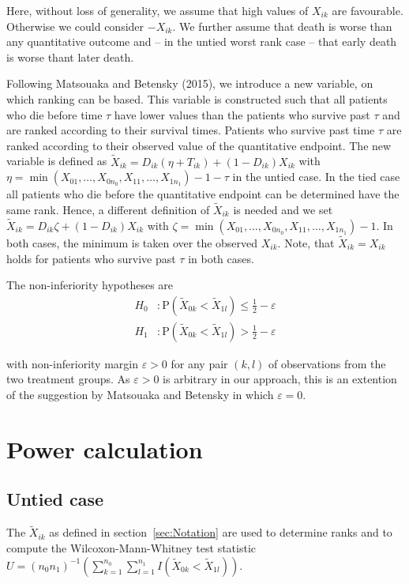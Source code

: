 \documentclass[bimj,fleqn]{w-art}
\theoremstyle{plain}
\theoremstyle{definition}
\begin{document}
Here, without loss of generality, we assume that high values of $X_{ik}$ are
favourable. Otherwise we could consider $-X_{ik}$. We further assume that
death is worse than any quantitative outcome and -- in the untied worst rank
case -- that early death is worse thant later death.

Following Matsouaka and Betensky (2015), we introduce a new variable, on which
ranking can be based. This variable is constructed such that all patients who
die before time $\tau$ have lower values than the patients who survive past
$\tau$ and are ranked according to their survival times. Patients who survive
past time $\tau$ are ranked according to their observed value of the quantitative
endpoint. The new variable is defined as
$\widetilde{X}_{ik} = D_{ik}(\eta  + T_{ik}) + (1 - D_{ik})X_{ik}$ with
$\eta = \min(X_{01}, \ldots, X_{0n_0}, X_{11}, \ldots, X_{1n_1}) - 1 - \tau$
in the untied case. In the tied case all patients who die before the quantitative endpoint
can be determined have the same rank. Hence, a different definition of $\widetilde{X}_{ik}$
is needed and we set  $\widetilde{X}_{ik} = D_{ik}\zeta   + (1 - D_{ik})X_{ik}$
with $\zeta = \min(X_{01}, \ldots, X_{0n_0}, X_{11}, \ldots, X_{1n_1}) - 1$.
In both cases, the minimum is taken over the observed $X_{ik}$.
Note, that  $\widetilde{X}_{ik} = {X}_{ik}$ holds for patients who survive past $\tau$ in both cases.

  The non-inferiority hypotheses are
\begin{align*}
  H_0 &:  \text{P}(\widetilde{X}_{0k} < \widetilde{X}_{1l})
          \leq \frac{1}{2} - \varepsilon \\
H_1 &:  \text{P}(\widetilde{X}_{0k} < \widetilde{X}_{1l})
          > \frac{1}{2} - \varepsilon
\end{align*}

with non-inferiority margin $\varepsilon > 0$ for any pair $(k, l)$ of
observations from the two treatment groups. As $\varepsilon > 0 $ is arbitrary
in our approach, this is an extention of the suggestion by Matsouaka and
Betensky in which $\varepsilon = 0 $.

\section{Power calculation}
\label{sec:Power}
\subsection{Untied case}
\label{sec:PowerUntied}
The $\widetilde{X}_{ik}$ as defined in section~\ref{sec:Notation} are used to
  determine ranks and to compute the Wilcoxon-Mann-Whitney test statistic
  $ U =(n_0 n_1)^{-1}(\sum_{k=1}^{n_0}
    \sum_{l=1}^{n_1}I(\widetilde{X}_{0k} < \widetilde{X}_{1l})) $.
\end{document}

